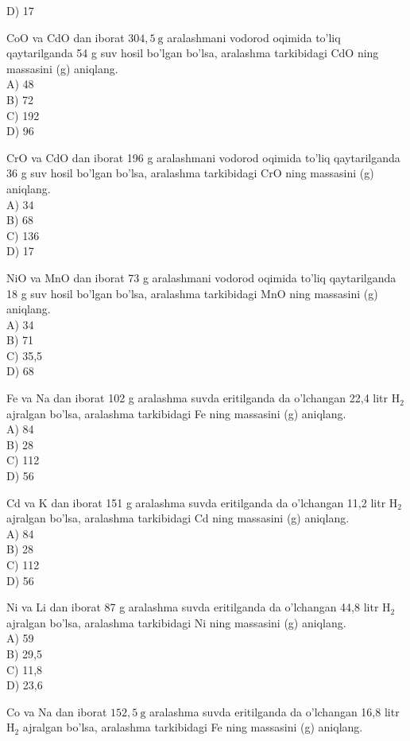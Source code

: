 D) 17
  \item CoO va CdO dan iborat $304,5 \mathrm{~g}$ aralashmani vodorod oqimida to'liq qaytarilganda 54 g suv hosil bo'lgan bo'lsa, aralashma tarkibidagi CdO ning massasini (g) aniqlang.\\
A) 48\\
B) 72\\
C) 192\\
D) 96
  \item CrO va CdO dan iborat 196 g aralashmani vodorod oqimida to'liq qaytarilganda 36 g suv hosil bo'lgan bo'lsa, aralashma tarkibidagi CrO ning massasini (g) aniqlang.\\
A) 34\\
B) 68\\
C) 136\\
D) 17
  \item NiO va MnO dan iborat 73 g aralashmani vodorod oqimida to'liq qaytarilganda 18 g suv hosil bo'lgan bo'lsa, aralashma tarkibidagi MnO ning massasini (g) aniqlang.\\
A) 34\\
B) 71\\
C) 35,5\\
D) 68
  \item Fe va Na dan iborat 102 g aralashma suvda eritilganda da o'lchangan 22,4 litr $\mathrm{H}_{2}$ ajralgan bo'lsa, aralashma tarkibidagi Fe ning massasini (g) aniqlang.\\
A) 84\\
B) 28\\
C) 112\\
D) 56
  \item Cd va K dan iborat 151 g aralashma suvda eritilganda da o'lchangan 11,2 litr $\mathrm{H}_{2}$ ajralgan bo'lsa, aralashma tarkibidagi Cd ning massasini (g) aniqlang.\\
A) 84\\
B) 28\\
C) 112\\
D) 56
  \item Ni va Li dan iborat 87 g aralashma suvda eritilganda da o'lchangan 44,8 litr $\mathrm{H}_{2}$ ajralgan bo'lsa, aralashma tarkibidagi Ni ning massasini (g) aniqlang.\\
A) 59\\
B) 29,5\\
C) 11,8\\
D) 23,6
  \item Co va Na dan iborat $152,5 \mathrm{~g}$ aralashma suvda eritilganda da o'lchangan 16,8 litr $\mathrm{H}_{2}$ ajralgan bo'lsa, aralashma tarkibidagi Fe ning massasini (g) aniqlang.\\

